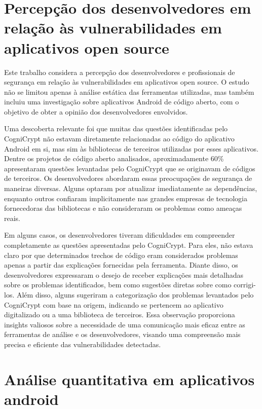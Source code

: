 

\section{Percepção dos desenvolvedores em relação às vulnerabilidades em aplicativos open source}

Este trabalho considera a percepção dos desenvolvedores e profissionais de segurança em relação às vulnerabilidades em aplicativos open source. O estudo não se limitou apenas à análise estática das ferramentas utilizadas, mas também incluiu uma investigação sobre aplicativos Android de código aberto, com o objetivo de obter a opinião dos desenvolvedores envolvidos.

Uma descoberta relevante foi que muitas das questões identificadas pelo CogniCrypt não estavam diretamente relacionadas ao código do aplicativo Android em si, mas sim às bibliotecas de terceiros utilizadas por esses aplicativos. Dentre os projetos de código aberto analisados, aproximadamente 60\% apresentaram questões levantadas pelo CogniCrypt que se originavam de códigos de terceiros. Os desenvolvedores abordaram essas preocupações de segurança de maneiras diversas. Alguns optaram por atualizar imediatamente as dependências, enquanto outros confiaram implicitamente nas grandes empresas de tecnologia fornecedoras das bibliotecas e não consideraram os problemas como ameaças reais.

Em alguns casos, os desenvolvedores tiveram dificuldades em compreender completamente as questões apresentadas pelo CogniCrypt. Para eles, não estava claro por que determinados trechos de código eram considerados problemas apenas a partir das explicações fornecidas pela ferramenta. Diante disso, os desenvolvedores expressaram o desejo de receber explicações mais detalhadas sobre os problemas identificados, bem como sugestões diretas sobre como corrigi-los. Além disso, alguns sugeriram a categorização dos problemas levantados pelo CogniCrypt com base na origem, indicando se pertencem ao aplicativo digitalizado ou a uma biblioteca de terceiros. Essa observação proporciona insights valiosos sobre a necessidade de uma comunicação mais eficaz entre as ferramentas de análise e os desenvolvedores, visando uma compreensão mais precisa e eficiente das vulnerabilidades detectadas.

\section{Análise quantitativa em aplicativos android}

